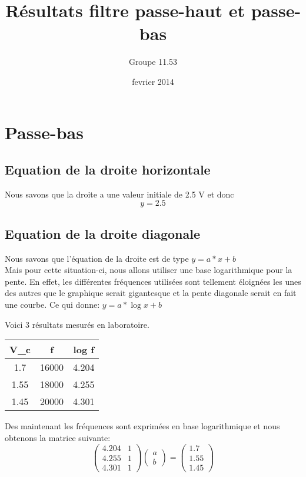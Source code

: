 \documentclass{report}
\title{Résultats filtre passe-haut et passe-bas}
\author{Groupe 11.53}
\date{fevrier 2014}
\begin{document}
 
\maketitle

\chapter{Passe-bas}
\section{Equation de la droite horizontale}

Nous savons que la droite a une valeur initiale de 2.5 V et donc \[y=2.5\]

\section{Equation de la droite diagonale}

Nous savons que l'équation de la droite est de type $y=a*x+b$
\\
Mais pour cette situation-ci, nous allons utiliser une base logarithmique pour la pente.  En effet, les différentes fréquences utilisées sont tellement éloignées les unes des autres que le graphique serait gigantesque et la pente diagonale serait en fait une courbe.  Ce qui donne: $y=a*\log{x}+b$


Voici 3 résultats mesurés en laboratoire.
\bigbreak
\\
\begin{tabular}{|c|c|c|}
\hline
V_c & f & log{ f} \\
\hline
1.7 & 16000 & 4.204\\
\hline
1.55 & 18000 & 4.255\\
\hline
1.45 & 20000 & 4.301 \\
\hline
\end{tabular}

\bigbreak
Des maintenant les fréquences sont exprimées en base logarithmique et nous obtenons la matrice suivante:
\bigbreak
$$
\begin{pmatrix}  
 4.204 & 1\\
 4.255 & 1 \\
 4.301 & 1 
\end{pmatrix}
\begin{pmatrix}  
a\\
b
\end{pmatrix}
=
\begin{pmatrix}  
1.7\\
1.55\\
1.45
\end{pmatrix}
$$
\bigbreak
\end{document}
